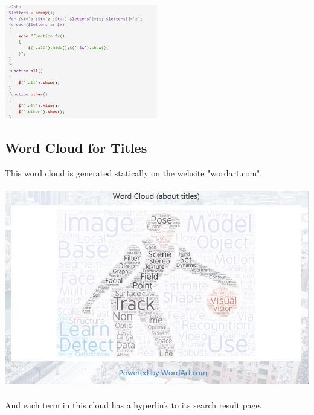 \documentclass{article}
\begin{document}
	\includegraphics[width=0.5\textwidth]{tab.png}\\
	
	\subsection{Word Cloud for Titles}
	This word cloud is generated statically on the website "wordart.com".\\\\
	\includegraphics[width=\textwidth]{wc.jpg}\\\\
	And each term in this cloud has a hyperlink to its search result page.\\
	
\end{document}
